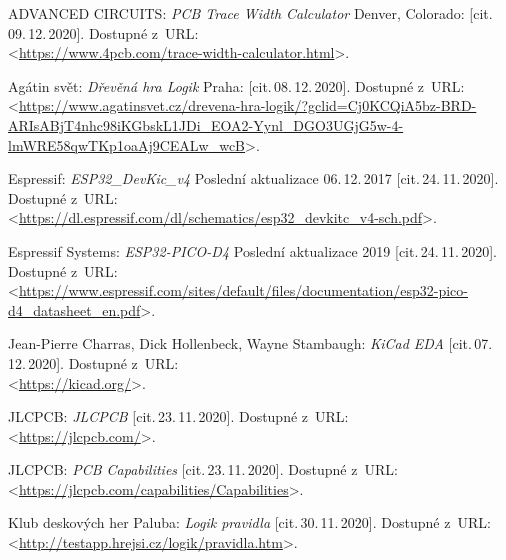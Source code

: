 

\begin{thebibliography}{99}
    ADVANCED CIRCUITS:
    \emph{PCB Trace Width Calculator}
    Denver, Colorado: [cit.\,09.\,12.\,2020].
    Dostupné z~URL:\\
    <\url{https://www.4pcb.com/trace-width-calculator.html}>.

    Agátin svět:
    \emph{Dřevěná hra Logik}
    Praha: [cit.\,08.\,12.\,2020].
    Dostupné z~URL:\\
    <\url{https://www.agatinsvet.cz/drevena-hra-logik/?gclid=Cj0KCQiA5bz-BRD-ARIsABjT4nhc98iKGbskL1JDi_EOA2-Yynl_DGO3UGjG5w-4-lmWRE58qwTKp1oaAj9CEALw_wcB}>.


    Espressif:
    \emph{ESP32\_DevKic\_v4}
    Poslední aktualizace 06.\,12.\,2017 [cit.\,24.\,11.\,2020].
    Dostupné z~URL:\\
    <\url{https://dl.espressif.com/dl/schematics/esp32_devkitc_v4-sch.pdf}>.

    Espressif Systems:
    \emph{ESP32-PICO-D4}
    Poslední aktualizace 2019 [cit.\,24.\,11.\,2020].
    Dostupné z~URL:\\
    <\url{https://www.espressif.com/sites/default/files/documentation/esp32-pico-d4_datasheet_en.pdf}>.

    Jean-Pierre Charras, Dick Hollenbeck, Wayne Stambaugh:
    \emph{KiCad EDA}
    [cit.\,07.\,12.\,2020].
    Dostupné z~URL:\\
    <\url{https://kicad.org/}>.

    JLCPCB:
    \emph{JLCPCB}
    [cit.\,23.\,11.\,2020].
    Dostupné z~URL:\\
    <\url{https://jlcpcb.com/}>.

    JLCPCB:
    \emph{PCB Capabilities}
    [cit.\,23.\,11.\,2020].
    Dostupné z~URL:\\
    <\url{https://jlcpcb.com/capabilities/Capabilities}>.

    Klub deskových her Paluba:
    \emph{Logik pravidla}
    [cit.\,30.\,11.\,2020].
    Dostupné z~URL:\\
    <\url{http://testapp.hrejsi.cz/logik/pravidla.htm}>.


\end{thebibliography}

